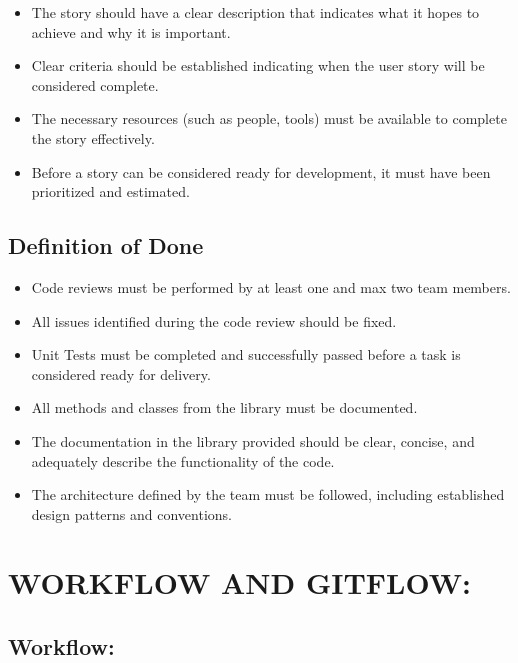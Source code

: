 \documentclass{article}
\providecommand{\tightlist}{
  \setlength{\itemsep}{0pt}\setlength{\parskip}{0pt}}
\begin{document}
\begin{itemize}
\tightlist
\item
  The story should have a clear description that indicates what it hopes
  to achieve and why it is important.
\item
  Clear criteria should be established indicating when the user story
  will be considered complete.
\item
  The necessary resources (such as people, tools) must be available to
  complete the story effectively.
\item
  Before a story can be considered ready for development, it must have
  been prioritized and estimated.
\end{itemize}

\hypertarget{definitionofdone}{
\subsection{\texorpdfstring{\textbf{Definition of
Done}}{Definition of Done}}\label{definitionofdone}}

\begin{itemize}
\tightlist
\item
  Code reviews must be performed by at least one and max two team
  members.
\item
  All issues identified during the code review should be fixed.
\item
  Unit Tests must be completed and successfully passed before a task is
  considered ready for delivery.
\item
  All methods and classes from the library must be documented.
\item
  The documentation in the library provided should be clear, concise, and adequately
  describe the functionality of the code.
\item
  The architecture defined by the team must be followed, including
  established design patterns and conventions.
\end{itemize}

\newpage

\hypertarget{workflow-gitflow}{
\section{WORKFLOW AND GITFLOW:}\label{workflow-gitflow}}

\hypertarget{workflow}{
\subsection{Workflow:}\label{workflow}}
\end{document}

